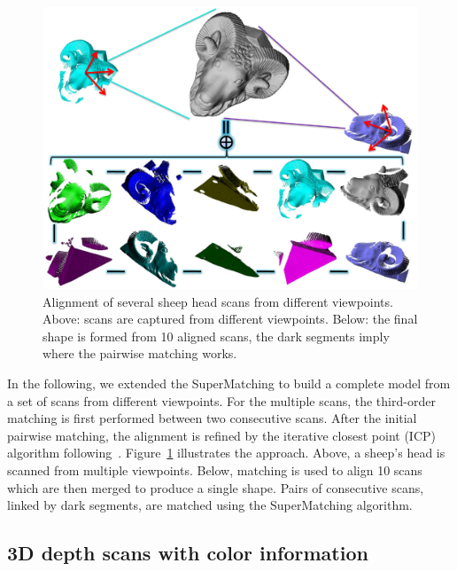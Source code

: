 \begin{figure}[tb]
\centering
  \includegraphics[width=0.99\linewidth]{figures/3DRigid.pdf}
  \caption{Alignment of several sheep head scans from different viewpoints.
  Above: scans are captured from different viewpoints. Below: the final shape is formed from 10 aligned scans, the dark segments imply where the pairwise matching works.}
\label{fig:3DRigid}
\end{figure}

In the following, we extended the SuperMatching to build a complete model from a set of scans from different viewpoints.
For the multiple scans, the third-order matching is first performed between two consecutive scans.
After the initial pairwise matching, the alignment is refined by the iterative closest point (ICP) algorithm following~\cite{Gelfand05}.
Figure~\ref{fig:3DRigid} illustrates the approach.
Above, a sheep's head is scanned from multiple viewpoints. Below, matching is used to align 10 scans which are then merged to produce a single shape.
Pairs of consecutive scans, linked by dark segments, are matched using the SuperMatching algorithm.


\subsection{3D depth scans with color information}
\label{subsec:3dColored}

